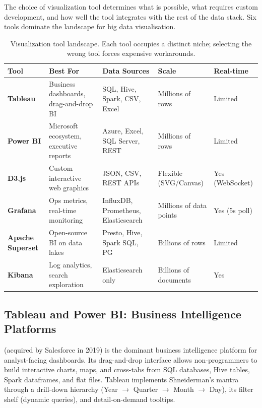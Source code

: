 The choice of visualization tool determines what is possible, what requires
custom development, and how well the tool integrates with the rest of the
data stack. Six tools dominate the landscape for big data visualisation.

\begin{table}[htbp]
\centering
\renewcommand{\arraystretch}{1.4}
\begin{tabular}{lp{3.0cm}p{2.8cm}p{2.0cm}l}
  \toprule
  \textbf{Tool} & \textbf{Best For}
    & \textbf{Data Sources} & \textbf{Scale} & \textbf{Real-time} \\
  \midrule
  \textbf{Tableau}
    & Business dashboards, drag-and-drop BI
    & SQL, Hive, Spark, CSV, Excel
    & Millions of rows
    & Limited \\
  \textbf{Power BI}
    & Microsoft ecosystem, executive reports
    & Azure, Excel, SQL Server, REST
    & Millions of rows
    & Limited \\
  \textbf{D3.js}
    & Custom interactive web graphics
    & JSON, CSV, REST APIs
    & Flexible (SVG/Canvas)
    & Yes (WebSocket) \\
  \textbf{Grafana}
    & Ops metrics, real-time monitoring
    & InfluxDB, Prometheus, Elasticsearch
    & Millions of data points
    & Yes (5s poll) \\
  \textbf{Apache Superset}
    & Open-source BI on data lakes
    & Presto, Hive, Spark SQL, PG
    & Billions of rows
    & Limited \\
  \textbf{Kibana}
    & Log analytics, search exploration
    & Elasticsearch only
    & Billions of documents
    & Yes \\
  \bottomrule
\end{tabular}
\caption{Visualization tool landscape. Each tool occupies a distinct
         niche; selecting the wrong tool forces expensive workarounds.}
\label{tab:viz-tools}
\end{table}

\subsection{Tableau and Power BI: Business Intelligence Platforms}
\label{subsec:tableau-powerbi}

 (acquired by Salesforce in 2019) is the dominant
business intelligence platform for analyst-facing dashboards. Its drag-and-drop
interface allows non-programmers to build interactive charts, maps, and
cross-tabs from SQL databases, Hive tables, Spark dataframes, and flat files.
Tableau implements Shneiderman's mantra through a drill-down hierarchy
(Year $\to$ Quarter $\to$ Month $\to$ Day), its filter shelf (dynamic
queries), and detail-on-demand tooltips.

